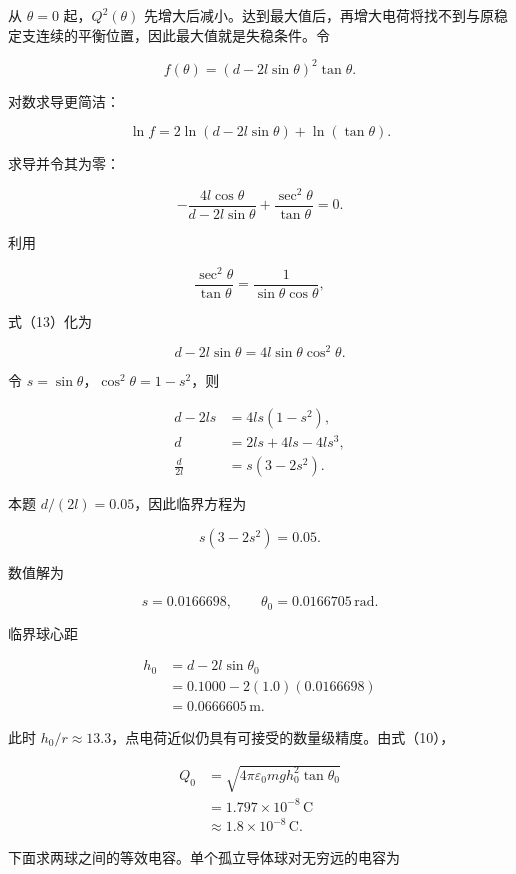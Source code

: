 \documentclass[12pt,a4paper,UTF8]{ctexart}
\begin{document}
从 \(\theta=0\) 起，\(Q^2(\theta)\)
先增大后减小。达到最大值后，再增大电荷将找不到与原稳定支连续的平衡位置，因此最大值就是失稳条件。令

\[
f(\theta)=(d-2l\sin\theta)^2\tan\theta. \tag{11}
\]

对数求导更简洁：

\[
\ln f
=2\ln(d-2l\sin\theta)+\ln(\tan\theta). \tag{12}
\]

求导并令其为零：

\[
-\frac{4l\cos\theta}{d-2l\sin\theta}
+\frac{\sec^2\theta}{\tan\theta}=0. \tag{13}
\]

利用

\[
\frac{\sec^2\theta}{\tan\theta}
=\frac1{\sin\theta\cos\theta}, \tag{14}
\]

式（13）化为

\[
d-2l\sin\theta
=4l\sin\theta\cos^2\theta. \tag{15}
\]

令 \(s=\sin\theta\)，\(\cos^2\theta=1-s^2\)，则

\[
\begin{aligned}
d-2ls&=4ls(1-s^2),\\
d&=2ls+4ls-4ls^3,\\
\frac d{2l}&=s(3-2s^2).
\end{aligned} \tag{16}
\]

本题 \(d/(2l)=0.05\)，因此临界方程为

\[
s(3-2s^2)=0.05. \tag{17}
\]

数值解为

\[
s=0.0166698,
\qquad
\theta_0=0.0166705\,\mathrm{rad}. \tag{18}
\]

临界球心距

\[
\begin{aligned}
h_0
&=d-2l\sin\theta_0\\
&=0.1000-2(1.0)(0.0166698)\\
&=0.0666605\,\mathrm m.
\end{aligned} \tag{19}
\]

此时
\(h_0/r\approx13.3\)，点电荷近似仍具有可接受的数量级精度。由式（10），

\[
\begin{aligned}
Q_0
&=\sqrt{4\pi\varepsilon_0mg h_0^2\tan\theta_0}\\
&=1.797\times10^{-8}\,\mathrm C\\
&\approx1.8\times10^{-8}\,\mathrm C.
\end{aligned} \tag{20}
\]

下面求两球之间的等效电容。单个孤立导体球对无穷远的电容为
\end{document}
